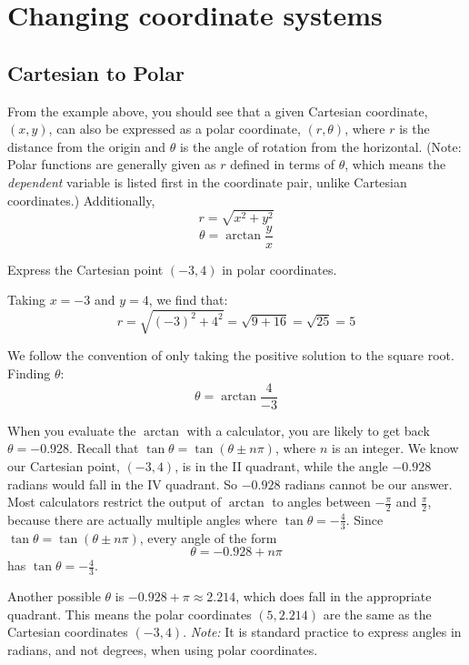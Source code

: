 \section{Changing coordinate systems}

\subsection{Cartesian to Polar}
From the example above, you should see that a given Cartesian coordinate, 
$(x,y)$, can also be expressed as a polar coordinate, $(r, \theta)$, where $r$ 
is the distance from the origin and $\theta$ is the angle of rotation from the 
horizontal. (Note: Polar functions are generally given as $r$ defined in terms 
of $\theta$, which means the \textit{dependent} variable is listed first in 
the coordinate pair, unlike Cartesian coordinates.) Additionally, 
$$r = \sqrt{x^2 + y^2}$$
$$\theta = \arctan{\frac{y}{x}}$$

\begin{Worked}
\begin{Problem}
Express the Cartesian point $(-3, 4)$ in polar coordinates. 
\end{Problem}
\begin{Solution}
Taking $x = -3$ and $y = 4$, we find that:
$$r = \sqrt{(-3)^2 + 4^2} = \sqrt{9 + 16} = \sqrt{25} = 5$$

We follow the convention of only taking the positive solution to the square 
root. Finding $\theta$:
$$\theta = \arctan{\frac{4}{-3}}$$

When you evaluate the $\arctan$ with a calculator, you are likely to get back 
$\theta = -0.928$. Recall that $\tan{\theta} = \tan{(\theta \pm n\pi)}$, where $n$ 
is an integer. We know our Cartesian point, $(-3, 4)$, is in the II quadrant, 
while the angle $-0.928$ radians would fall in the IV quadrant. So 
$-0.928$ radians cannot be our answer. Most calculators restrict the output of 
$\arctan$ to angles between $-\frac{\pi}{2}$ and $\frac{\pi}{2}$, because 
there are actually multiple angles where $\tan{\theta} = -\frac{4}{3}$. Since 
$\tan{\theta} = \tan{(\theta \pm n \pi)}$, every angle of the form
$$\theta = -0.928 + n \pi$$
has $\tan{\theta} = -\frac{4}{3}$.

Another possible $\theta$ is $-0.928 + \pi \approx 2.214$, which does fall 
in the appropriate quadrant. This means the polar coordinates $(5, 2.214)$ are the 
same as the Cartesian coordinates $(-3, 4)$. \textit{Note:} It is standard 
practice to express angles in radians, and not degrees, when using polar 
coordinates. 
\end{Solution}
\end{Worked}

